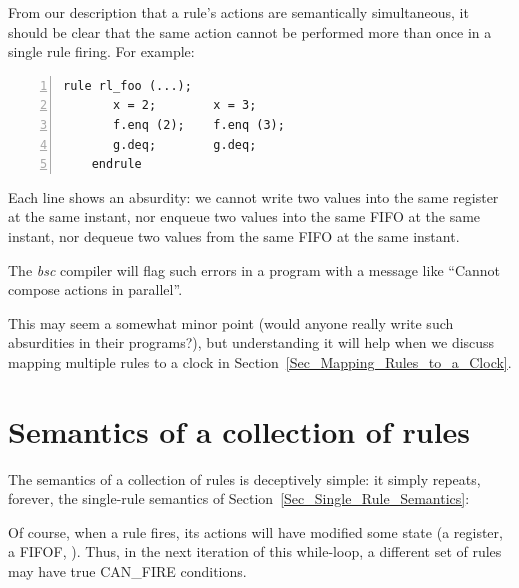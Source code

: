 \label{Sec_Parallel_Conflict}

From our description that a rule's actions are semantically
simultaneous, it should be clear that the same action cannot be
performed more than once in a single rule firing.  For example:

{\footnotesize
\begin{Verbatim}[frame=single, numbers=left]
    rule rl_foo (...);
       x = 2;        x = 3;
       f.enq (2);    f.enq (3);
       g.deq;        g.deq;
    endrule
\end{Verbatim}
}

Each line shows an absurdity: we cannot write two values into the same
register at the same instant, nor enqueue two values into the same
FIFO at the same instant, nor dequeue two values from the same FIFO at
the same instant.

The \emph{bsc} compiler will flag such errors in a program with a
message like ``Cannot compose actions in parallel''.

This may seem a somewhat minor point (would anyone really write such
absurdities in their programs?), but understanding it will help when
we discuss mapping multiple rules to a clock in
Section~\ref{Sec_Mapping_Rules_to_a_Clock}.


\section{Semantics of a collection of rules}

\label{Sec_Rules_Semantics}


The semantics of a collection of rules is deceptively simple: it
simply repeats, forever, the single-rule semantics of
Section~\ref{Sec_Single_Rule_Semantics}:

\begin{center}
\end{center}

Of course, when a rule fires, its actions will have modified some
state (a register, a FIFOF, {\etc}).  Thus, in the next iteration of
this while-loop, a different set of rules may have true CAN\_FIRE
conditions.


